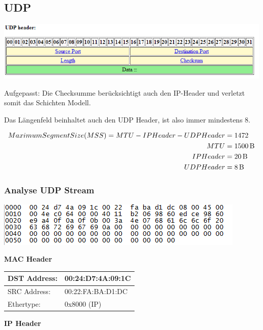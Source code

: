 \subsection{UDP}

\includegraphics[width=\textwidth]{media/UDPHeader.png}

Aufgepasst: Die Checksumme berücksichtigt auch den IP-Header und verletzt somit
das Schichten Modell.

Das Längenfeld beinhaltet auch den UDP Header, ist also immer mindestens 8.

\begin{align*}
Maximum Segment Size (MSS) = MTU - IPHeader - UDP Header &= 1472\\
MTU &= \SI{1500}{\byte}\\
IPHeader &= \SI{20}{\byte}\\
UDPHeader &= \SI{8}{\byte}
\end{align*}

\subsubsection{Analyse UDP Stream}

\includegraphics[scale=1.0]{media/UDPStream.png}

\textbf{MAC Header}

\begin{tabular}[h]{|l|l|}
	\hline
	DST Address: & 00:24:D7:4A:09:1C \\
	\hline
	SRC Address: & 00:22:FA:BA:D1:DC \\
	\hline
	Ethertype: & 0x8000 (IP) \\
	\hline
\end{tabular}

\textbf{IP Header}

